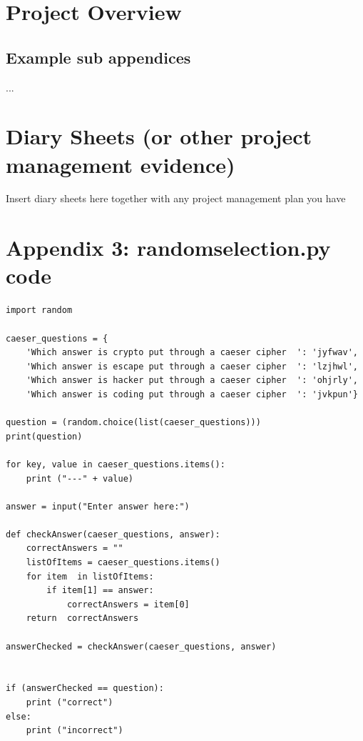 \documentclass[12pt,a4paper]{article}
\begin{document}
\newpage
\begin{appendices}
\section{Project Overview}

\begin{subappendices}
\subsection{Example sub appendices}
...
\end{subappendices}



\section{Diary Sheets (or other project management evidence)}
Insert diary sheets here together with any project management plan you have

\section{Appendix 3: random\textunderscore selection.py code}
\begin{lstlisting}
import random

caeser_questions = { 
    'Which answer is crypto put through a caeser cipher  ': 'jyfwav', 
    'Which answer is escape put through a caeser cipher  ': 'lzjhwl', 
    'Which answer is hacker put through a caeser cipher  ': 'ohjrly',  
    'Which answer is coding put through a caeser cipher  ': 'jvkpun'}  

question = (random.choice(list(caeser_questions)))
print(question)

for key, value in caeser_questions.items(): 
    print ("---" + value) 
   
answer = input("Enter answer here:") 

def checkAnswer(caeser_questions, answer): 
    correctAnswers = "" 
    listOfItems = caeser_questions.items() 
    for item  in listOfItems:
        if item[1] == answer:
            correctAnswers = item[0] 
    return  correctAnswers 

answerChecked = checkAnswer(caeser_questions, answer)  


if (answerChecked == question): 
    print ("correct")  
else: 
    print ("incorrect") 
\end{lstlisting}    

\end{appendices}
\end{document}
